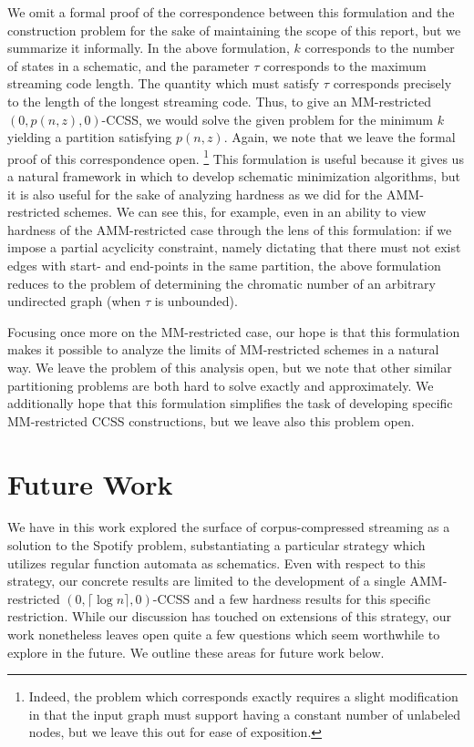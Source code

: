 \documentclass{article}
\theoremstyle{definition}
\begin{document}
We omit a formal proof of the correspondence between this formulation and the 
construction problem for the sake of maintaining the scope of this report, 
but we summarize it informally.  In the above formulation, $k$ corresponds to 
the number of states in a schematic, and the parameter $\tau$ corresponds 
to the maximum streaming code length.  The quantity which must satisfy $\tau$ corresponds precisely to the length of the longest streaming code.  
Thus, to give an MM-restricted 
$(0, p(n,z), 0)$-CCSS, we would solve the given problem for the minimum $k$ yielding
a partition satisfying $p(n,z)$.  Again, we note that we leave the formal proof of this correspondence open.
\footnote{Indeed, the problem which corresponds exactly requires a slight modification 
in that the input graph must support having a constant number of unlabeled nodes, 
but we leave this out for ease of exposition.}
\newline\newline
This formulation is useful because it gives us a natural framework in which to 
develop schematic minimization algorithms, but it is also useful for the sake 
of analyzing hardness as we did for the AMM-restricted schemes.  We can 
see this, for example, even in an ability to view hardness of the AMM-restricted case through the 
lens of this formulation: if we impose a partial acyclicity constraint, 
namely dictating that there must not exist edges with start- and end-points in the same partition, 
the above formulation reduces to the problem of determining the chromatic 
number of an arbitrary undirected graph (when $\tau$ is unbounded).

Focusing once more on the MM-restricted case, our hope is that this formulation 
makes it possible to analyze the limits of MM-restricted schemes in a natural way.
We leave the problem of this analysis open, but we note that other similar 
partitioning problems \cite{PartitionHard} are both hard to solve exactly 
and approximately.  We additionally hope that this formulation simplifies the 
task of developing specific MM-restricted CCSS constructions, but we leave also 
this problem open.

\section{Future Work}

We have in this work explored the surface of corpus-compressed streaming 
as a solution to the Spotify problem, substantiating a particular strategy 
which utilizes regular function automata as schematics.  Even with respect to 
this strategy, our concrete results are limited to the development of a single
AMM-restricted $(0, \lceil \log{n} \rceil, 0)$-CCSS and a few hardness results for 
this specific restriction.  While our discussion has touched on extensions of this 
strategy, our work nonetheless leaves open quite a few questions which seem 
worthwhile to explore in the future.  We outline these areas for future work below.
\end{document}
